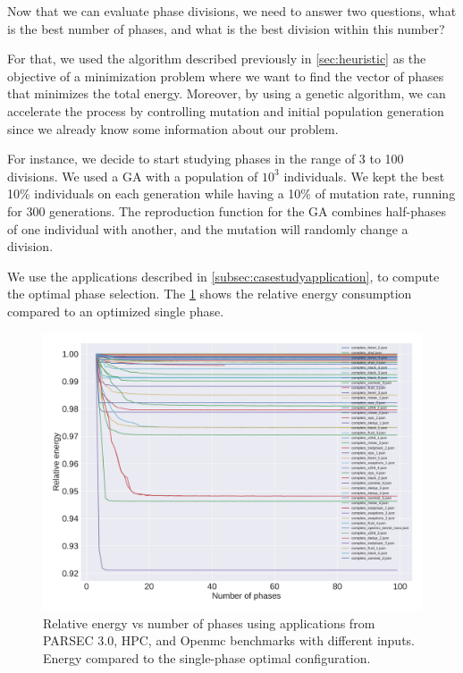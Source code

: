 Now that we can evaluate phase divisions, we need to answer two questions, what is the best number of phases, and what is the best division within this number?

For that, we used the algorithm described previously in \cref{sec:heuristic} as the objective of a minimization problem where we want to find the vector of phases that minimizes the total energy. Moreover, by using a genetic algorithm, we can accelerate the process by controlling mutation and initial population generation since we already know some information about our problem.

For instance, we decide to start studying phases in the range of 3 to 100 divisions. We used a GA with a population of $10^3$ individuals. We kept the best 10\% individuals on each generation while having a 10\% of mutation rate, running for 300 generations. The reproduction function for the GA combines half-phases of one individual with another, and the mutation will randomly change a division.

We use the applications described in \cref{subsec:casestudyapplication}, to compute the optimal phase selection. The \cref{fig:relative_energy} shows the relative energy consumption compared to an optimized single phase.

\begin{figure}[H]
	\includegraphics[width=\columnwidth]{fingerprint/figures/energy_per_phase.pdf}
	\caption{Relative energy vs number of phases using applications from PARSEC 3.0, HPC, and Openmc benchmarks with different inputs. Energy compared to the single-phase optimal configuration.}
	\label{fig:relative_energy}
\end{figure}

